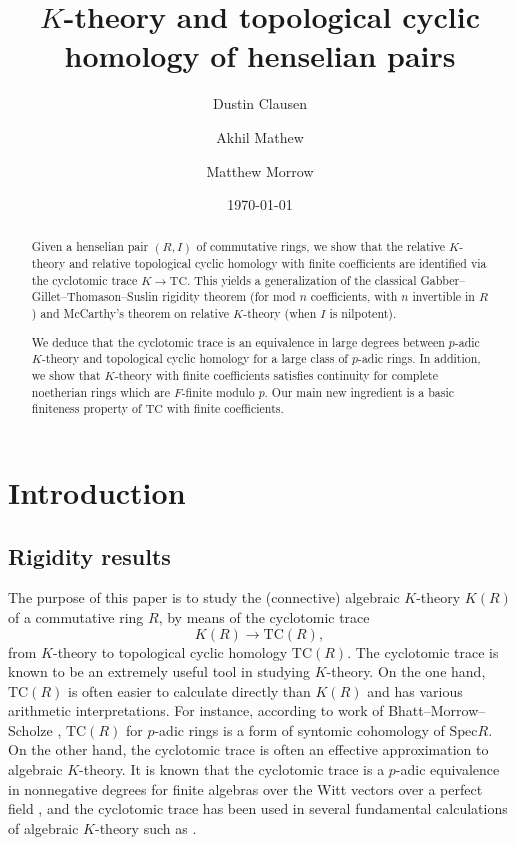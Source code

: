 \documentclass{amsart}
\newcommand{\spec}{\mathrm{Spec}}
\theoremstyle{definition}
\newcommand{\TC}{\mathrm{TC}}
\begin{document}
\title{$K$-theory and topological cyclic homology of henselian pairs}
\date{\today}

\author{Dustin Clausen}
\address{Max-Planck-Institut f\"ur Mathematik, Bonn}

\author{Akhil Mathew}
\address{Department of Mathematics, University of Chicago}

\author{Matthew Morrow}
\address{CNRS \& Institut de Math\'ematiques de Jussieu-Paris Rive Gauche, Sorbonne Universit\'e
}

\maketitle 
\begin{abstract}
Given a henselian pair $(R, I)$ 
of commutative rings, 
we show that the relative $K$-theory and relative topological cyclic homology
with finite coefficients are identified via the cyclotomic trace $K \to \TC$. 
This yields a generalization of the classical Gabber--Gillet--Thomason--Suslin rigidity theorem 
(for mod $n$ coefficients, with $n$ invertible in $R$) and McCarthy's theorem on
relative $K$-theory (when
$I$ is nilpotent). 

We deduce that the cyclotomic trace is an equivalence in large
degrees between $p$-adic $K$-theory and topological cyclic homology for 
a large class of $p$-adic rings. 
In addition, we show that $K$-theory with finite coefficients satisfies continuity 
for complete noetherian rings which are $F$-finite modulo $p$. 
Our main new ingredient is a basic finiteness property of $\TC$ with finite
coefficients. 
\end{abstract}

\tableofcontents

\section{Introduction}

\subsection{Rigidity results}
The purpose of this paper is to study the (connective) algebraic $K$-theory $K(R)$ of a commutative ring $R$, by means of the cyclotomic trace \cite{BHM}
\[ K(R) \to \TC(R),   \]
from $K$-theory to {topological cyclic homology} $\TC(R)$. 
The cyclotomic trace is known to be an extremely useful tool in studying
$K$-theory. On the one hand, $\TC(R)$ is often easier to calculate directly than
$K(R)$ and has various arithmetic interpretations. For
instance, according to work of Bhatt--Morrow--Scholze \cite{BMS2}, $\TC(R)$ for
$p$-adic rings is a form of syntomic cohomology of $\spec R$. On the other
hand, the cyclotomic trace is often an effective approximation to algebraic
$K$-theory. It is known that the cyclotomic
trace is a $p$-adic equivalence in nonnegative degrees for finite algebras over the Witt vectors over a
perfect field \cite{HM97}, and the cyclotomic trace has been used in several
fundamental calculations of algebraic $K$-theory such as \cite{HMlocal}.
\end{document}
